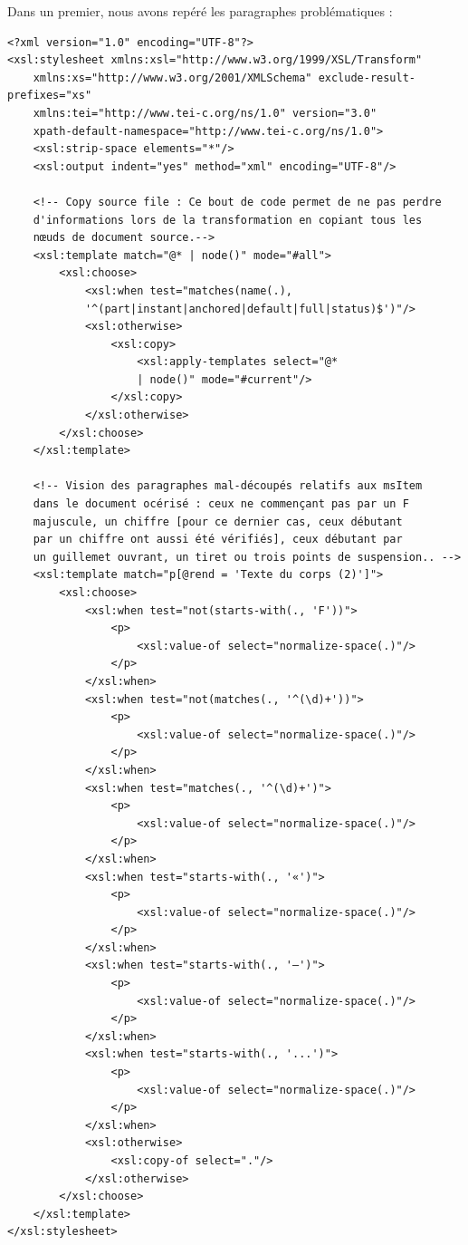 \documentclass[a4paper,12pt,twoside]{book}
\begin{document}
    Dans un premier, nous avons repéré les paragraphes problématiques :
    
    \begin{verbatim}
<?xml version="1.0" encoding="UTF-8"?>
<xsl:stylesheet xmlns:xsl="http://www.w3.org/1999/XSL/Transform"
    xmlns:xs="http://www.w3.org/2001/XMLSchema" exclude-result-prefixes="xs"
    xmlns:tei="http://www.tei-c.org/ns/1.0" version="3.0"
    xpath-default-namespace="http://www.tei-c.org/ns/1.0">
    <xsl:strip-space elements="*"/>
    <xsl:output indent="yes" method="xml" encoding="UTF-8"/>

    <!-- Copy source file : Ce bout de code permet de ne pas perdre 
    d'informations lors de la transformation en copiant tous les 
    nœuds de document source.-->
    <xsl:template match="@* | node()" mode="#all">
        <xsl:choose>
            <xsl:when test="matches(name(.), 
            '^(part|instant|anchored|default|full|status)$')"/>
            <xsl:otherwise>
                <xsl:copy>
                    <xsl:apply-templates select="@* 
                    | node()" mode="#current"/>
                </xsl:copy>
            </xsl:otherwise>
        </xsl:choose>
    </xsl:template>

    <!-- Vision des paragraphes mal-découpés relatifs aux msItem 
    dans le document océrisé : ceux ne commençant pas par un F 
    majuscule, un chiffre [pour ce dernier cas, ceux débutant 
    par un chiffre ont aussi été vérifiés], ceux débutant par 
    un guillemet ouvrant, un tiret ou trois points de suspension.. -->
    <xsl:template match="p[@rend = 'Texte du corps (2)']">
        <xsl:choose>
            <xsl:when test="not(starts-with(., 'F'))">
                <p>
                    <xsl:value-of select="normalize-space(.)"/>
                </p>
            </xsl:when>
            <xsl:when test="not(matches(., '^(\d)+'))">
                <p>
                    <xsl:value-of select="normalize-space(.)"/>
                </p>
            </xsl:when>
            <xsl:when test="matches(., '^(\d)+')">
                <p>
                    <xsl:value-of select="normalize-space(.)"/>
                </p>
            </xsl:when>
            <xsl:when test="starts-with(., '«')">
                <p>
                    <xsl:value-of select="normalize-space(.)"/>
                </p>
            </xsl:when>
            <xsl:when test="starts-with(., '—')">
                <p>
                    <xsl:value-of select="normalize-space(.)"/>
                </p>
            </xsl:when>
            <xsl:when test="starts-with(., '...')">
                <p>
                    <xsl:value-of select="normalize-space(.)"/>
                </p>
            </xsl:when>
            <xsl:otherwise>
                <xsl:copy-of select="."/>
            </xsl:otherwise>
        </xsl:choose>
    </xsl:template>
</xsl:stylesheet>
    \end{verbatim}
    
\end{document}
